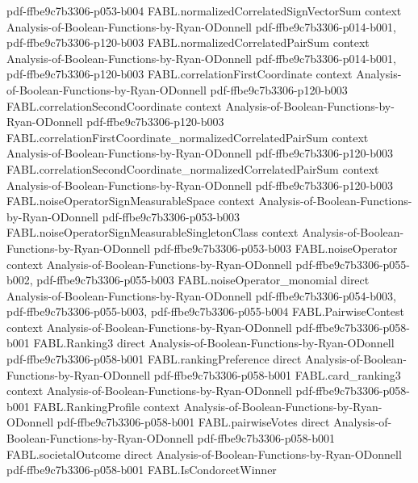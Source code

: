 \begin{theorem}
  {pdf-ffbe9c7b3306-p053-b004}
\proofstep
  {FABL.normalizedCorrelatedSignVectorSum}
  {context}
  {Analysis-of-Boolean-Functions-by-Ryan-ODonnell}
  {pdf-ffbe9c7b3306-p014-b001,
    pdf-ffbe9c7b3306-p120-b003}
\proofstep
  {FABL.normalizedCorrelatedPairSum}
  {context}
  {Analysis-of-Boolean-Functions-by-Ryan-ODonnell}
  {pdf-ffbe9c7b3306-p014-b001,
    pdf-ffbe9c7b3306-p120-b003}
\proofstep
  {FABL.correlationFirstCoordinate}
  {context}
  {Analysis-of-Boolean-Functions-by-Ryan-ODonnell}
  {pdf-ffbe9c7b3306-p120-b003}
\proofstep
  {FABL.correlationSecondCoordinate}
  {context}
  {Analysis-of-Boolean-Functions-by-Ryan-ODonnell}
  {pdf-ffbe9c7b3306-p120-b003}
\proofstep
  {FABL.correlationFirstCoordinate_normalizedCorrelatedPairSum}
  {context}
  {Analysis-of-Boolean-Functions-by-Ryan-ODonnell}
  {pdf-ffbe9c7b3306-p120-b003}
\proofstep
  {FABL.correlationSecondCoordinate_normalizedCorrelatedPairSum}
  {context}
  {Analysis-of-Boolean-Functions-by-Ryan-ODonnell}
  {pdf-ffbe9c7b3306-p120-b003}
\proofstep
  {FABL.noiseOperatorSignMeasurableSpace}
  {context}
  {Analysis-of-Boolean-Functions-by-Ryan-ODonnell}
  {pdf-ffbe9c7b3306-p053-b003}
\proofstep
  {FABL.noiseOperatorSignMeasurableSingletonClass}
  {context}
  {Analysis-of-Boolean-Functions-by-Ryan-ODonnell}
  {pdf-ffbe9c7b3306-p053-b003}
\proofstep
  {FABL.noiseOperator}
  {context}
  {Analysis-of-Boolean-Functions-by-Ryan-ODonnell}
  {pdf-ffbe9c7b3306-p055-b002,
    pdf-ffbe9c7b3306-p055-b003}
\proofstep
  {FABL.noiseOperator_monomial}
  {direct}
  {Analysis-of-Boolean-Functions-by-Ryan-ODonnell}
  {pdf-ffbe9c7b3306-p054-b003,
    pdf-ffbe9c7b3306-p055-b003,
    pdf-ffbe9c7b3306-p055-b004}
\proofstep
  {FABL.PairwiseContest}
  {context}
  {Analysis-of-Boolean-Functions-by-Ryan-ODonnell}
  {pdf-ffbe9c7b3306-p058-b001}
\proofstep
  {FABL.Ranking3}
  {direct}
  {Analysis-of-Boolean-Functions-by-Ryan-ODonnell}
  {pdf-ffbe9c7b3306-p058-b001}
\proofstep
  {FABL.rankingPreference}
  {direct}
  {Analysis-of-Boolean-Functions-by-Ryan-ODonnell}
  {pdf-ffbe9c7b3306-p058-b001}
\proofstep
  {FABL.card_ranking3}
  {context}
  {Analysis-of-Boolean-Functions-by-Ryan-ODonnell}
  {pdf-ffbe9c7b3306-p058-b001}
\proofstep
  {FABL.RankingProfile}
  {context}
  {Analysis-of-Boolean-Functions-by-Ryan-ODonnell}
  {pdf-ffbe9c7b3306-p058-b001}
\proofstep
  {FABL.pairwiseVotes}
  {direct}
  {Analysis-of-Boolean-Functions-by-Ryan-ODonnell}
  {pdf-ffbe9c7b3306-p058-b001}
\proofstep
  {FABL.societalOutcome}
  {direct}
  {Analysis-of-Boolean-Functions-by-Ryan-ODonnell}
  {pdf-ffbe9c7b3306-p058-b001}
\proofstep
  {FABL.IsCondorcetWinner}

\end{theorem}
